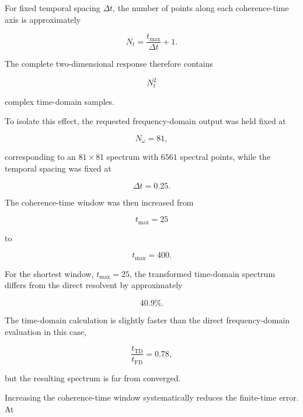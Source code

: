 \documentclass[11pt]{article}
\begin{document}
For fixed temporal spacing $\Delta t$, the number of points along each
coherence-time axis is approximately

\begin{equation}
N_t
=
\frac{t_{\max}}{\Delta t}+1.
\end{equation}

The complete two-dimensional response therefore contains

\begin{equation}
\boxed{
N_t^2
}
\end{equation}

complex time-domain samples.

To isolate this effect, the requested frequency-domain output was held
fixed at

\begin{equation}
N_\omega=81,
\end{equation}

corresponding to an $81\times81$ spectrum with $6561$ spectral points,
while the temporal spacing was fixed at

\begin{equation}
\Delta t=0.25.
\end{equation}

The coherence-time window was then increased from

\begin{equation}
t_{\max}=25
\end{equation}

to

\begin{equation}
t_{\max}=400.
\end{equation}

For the shortest window, $t_{\max}=25$, the transformed time-domain
spectrum differs from the direct resolvent by approximately

\begin{equation}
40.9\%.
\end{equation}

The time-domain calculation is slightly faster than the direct
frequency-domain evaluation in this case,

\begin{equation}
\frac{t_{\mathrm{TD}}}{t_{\mathrm{FD}}}
=
0.78,
\end{equation}

but the resulting spectrum is far from converged.

Increasing the coherence-time window systematically reduces the
finite-time error.  At
\end{document}
